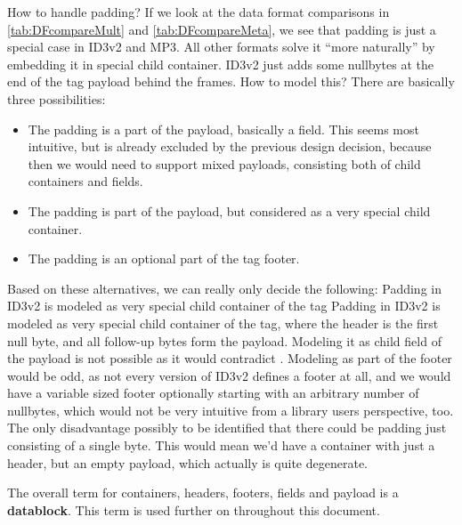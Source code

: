 How to handle padding? If we look at the data format comparisons in \ref{tab:DFcompareMult} and \ref{tab:DFcompareMeta}, we see that padding is just a special case in ID3v2 and MP3. All other formats solve it ``more naturally'' by embedding it in special child container. ID3v2 just adds some nullbytes at the end of the tag payload behind the frames. How to model this? There are basically three possibilities:
\begin{itemize}
\item The padding is a part of the payload, basically a field. This seems most intuitive, but is already excluded by the previous design decision, because then we would need to support mixed payloads, consisting both of child containers and fields.
\item The padding is part of the payload, but considered as a very special child container.
\item The padding is an optional part of the tag footer.
\end{itemize}

Based on these alternatives, we can really only decide the following:
{%
Padding in ID3v2 is modeled as very special child container of the tag
}
{%
Padding in ID3v2 is modeled as very special child container of the tag, where the header is the first null byte, and all follow-up bytes form the payload. 
}
{%
Modeling it as child field of the payload is not possible as it would contradict . Modeling as part of the footer would be odd, as not every version of ID3v2 defines a footer at all, and we would have a variable sized footer optionally starting with an arbitrary number of nullbytes, which would not be very intuitive from a library users perspective, too.
}
{%
The only disadvantage possibly to be identified that there could be padding just consisting of a single byte. This would mean we'd have a container with just a header, but an empty payload, which actually is quite degenerate.
}

The overall term for containers, headers, footers, fields and payload is a \textbf{datablock}. This term is used further on throughout this document.

